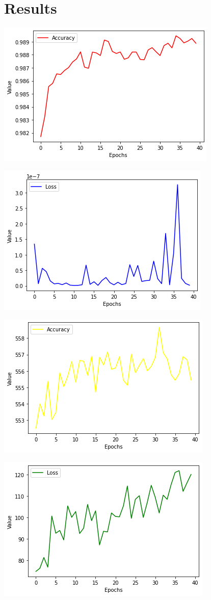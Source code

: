\section{Results}

\includegraphics{img/train_acc.png}

\includegraphics{img/train_loss.png}

\includegraphics{img/valid_acc.png}

\includegraphics{img/valid_loss.png}
